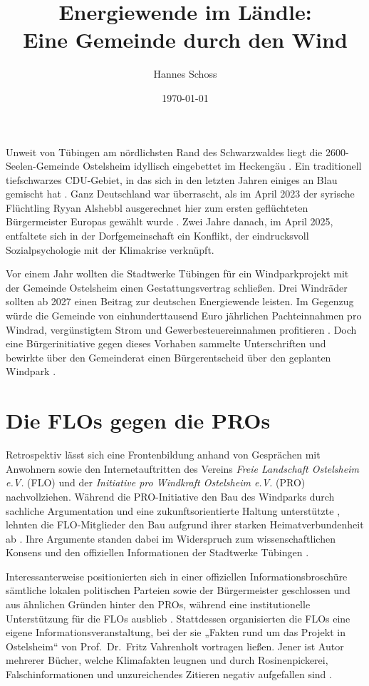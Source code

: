 \documentclass[12pt,a4paper]{article}
\title{Energiewende im Ländle:\\
Eine Gemeinde durch den Wind}
\author{Hannes Schoss}
\date{\today}
\begin{document}
\maketitle


Unweit von Tübingen am nördlichsten Rand des Schwarzwaldes liegt die
2600-Seelen-Gemeinde Ostelsheim idyllisch eingebettet im Heckengäu
\cite{ostelsheim2024}. Ein traditionell tiefschwarzes CDU-Gebiet, in das sich
in den letzten Jahren einiges an Blau gemischt hat \cite{bundestagswahl2025}.
Ganz Deutschland war überrascht, als im April 2023 der syrische Flüchtling
Ryyan Alshebbl ausgerechnet hier zum ersten geflüchteten Bürgermeister Europas
gewählt wurde \cite{boell2023}. Zwei Jahre danach, im April 2025, entfaltete
sich in der Dorfgemeinschaft ein Konflikt, der eindrucksvoll Sozialpsychologie
mit der Klimakrise verknüpft.

Vor einem Jahr wollten die Stadtwerke Tübingen für ein Windparkprojekt mit der
Gemeinde Ostelsheim einen Gestattungsvertrag schließen. Drei Windräder sollten
ab 2027 einen Beitrag zur deutschen Energiewende leisten. Im Gegenzug würde die
Gemeinde von einhunderttausend Euro jährlichen Pachteinnahmen pro Windrad,
vergünstigtem Strom und Gewerbesteuereinnahmen profitieren
\cite{holzapfel2025}. Doch eine Bürgerinitiative gegen dieses Vorhaben sammelte
Unterschriften und bewirkte über den Gemeinderat einen Bürgerentscheid über den
geplanten Windpark \cite{biermayer2025}.

\section{Die FLOs gegen die PROs}

Retrospektiv lässt sich eine Frontenbildung anhand von Gesprächen mit Anwohnern
sowie den Internetauftritten des Vereins \textit{Freie Landschaft Ostelsheim
e.V.} (FLO) und der \textit{Initiative pro Windkraft Ostelsheim e.V.} (PRO)
nachvollziehen. Während die PRO-Initiative den Bau des Windparks durch
sachliche Argumentation und eine zukunftsorientierte Haltung unterstützte
\cite{nothacker2025}, lehnten die FLO-Mitglieder den Bau aufgrund ihrer starken
Heimatverbundenheit ab \cite{obermaier2025}. Ihre Argumente standen dabei im
Widerspruch zum wissenschaftlichen Konsens und den offiziellen Informationen
der Stadtwerke Tübingen \cite{holzapfel2025}.

Interessanterweise positionierten sich in einer offiziellen
Informationsbroschüre sämtliche lokalen politischen Parteien sowie der
Bürgermeister geschlossen und aus ähnlichen Gründen hinter den PROs, während
eine institutionelle Unterstützung für die FLOs ausblieb \cite{alshebbl2025}.
Stattdessen organisierten die FLOs eine eigene Informationsveranstaltung, bei
der sie „Fakten rund um das Projekt in Ostelsheim“ von Prof.~Dr.~Fritz
Vahrenholt vortragen ließen. Jener ist Autor mehrerer Bücher, welche
Klimafakten leugnen und durch Rosinenpickerei, Falschinformationen und
unzureichendes Zitieren negativ aufgefallen sind \cite{mohn2012}.
\end{document}
